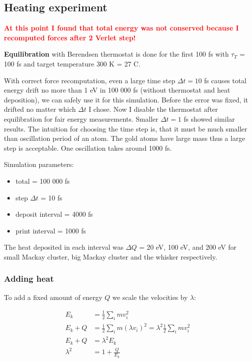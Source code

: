 \documentclass[12pt,a4paper]{article}
\begin{document}
\subsection*{Heating experiment}

\textcolor{red}{\large\bf At this point I found that total energy was not conserved because I recomputed forces after 2 Verlet step!}

{\bf Equilibration} with Berendsen thermostat is done for the first 100 fs with $\tau_T$ = 100 fs and target temperature 300 K = 27 C.

With correct force recomputation, even a large time step $\Delta t=10$ fs causes total energy drift no more than 1 eV in 100 000 fs (without thermostat and heat deposition), we can safely use it for this simulation. Before the error was fixed, it drifted no matter which $\Delta t$ I chose. Now I disable the thermostat after equilibration for fair energy measurements. Smaller $\Delta t = 1$ fs showed similar results. The intuition for choosing the time step is, that it must be much smaller than oscillation period of an atom. The gold atoms have large mass thus a large step is acceptable. One oscillation takes around 1000 fs.

Simulation parameters:
\begin{itemize}
	\item total = 100 000 fs
	\item step $\Delta t$ = 10 fs
	\item deposit interval = 4000 fs
	\item print interval = 1000 fs
\end{itemize}

The heat deposited in each interval was $\Delta Q$ = 20 eV, 100 eV, and 200 eV for small Mackay cluster, big Mackay cluster and the whisker respectively.

\subsubsection*{Adding heat}

To add a fixed amount of energy $Q$ we scale the velocities by $\lambda$:

\[
\begin{aligned}
	E_k &= \frac{1}{2} \sum_i m v_i^2 \\
	E_k + Q &= \frac{1}{2} \sum_i m (\lambda v_i)^2 = \lambda^2 \frac{1}{2} \sum_i m v_i^2 \\
	E_k + Q &= \lambda^2 E_k \\
	\lambda^2 &= 1 + \frac{Q}{E_k} \\
\end{aligned}
\]
\end{document}
